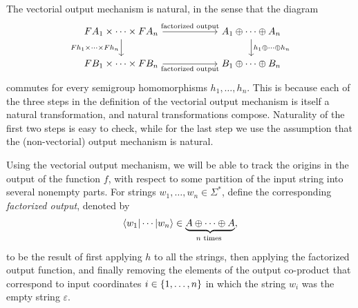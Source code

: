 The  vectorial output mechanism is natural, in the  sense that  the diagram 
\[
\begin{tikzcd}
    [column sep=2cm]
\functor A_1 \times \cdots \times \functor A_n
\ar[r,"\text{factorized output}"]
\ar[d,"\functor h_1 \times \cdots \times \functor h_n"']
&
A_1 \oplus \cdots \oplus A_n
\ar[d,"h_1 \oplus \cdots \oplus h_n"]
\\
\functor B_1 \times \cdots \times \functor B_n
\ar[r,"\text{factorized output}"']
&
B_1 \oplus \cdots \oplus B_n
\end{tikzcd}
\]
commutes
for every semigroup homomorphisms $h_1,\ldots,h_n$. This is because each of the three steps in the definition of the vectorial output mechanism is itself a natural transformation, and natural transformations compose.  Naturality of the first two steps is easy to check, while for the last step we use the assumption that the (non-vectorial) output mechanism is natural.



    
Using the vectorial output mechanism, we will be able to track the origins in the output of the function $f$, with respect to some partition of the input string into several nonempty parts.
For  strings $w_1,\ldots,w_n \in \Sigma^*$, define the corresponding \emph{factorized output}, denoted by 
\begin{align*}
\tuple{w_1| \cdots | w_n} \in \myunderbrace{A \oplus \cdots \oplus A}{$n$ times},
\end{align*}
to be the result of first applying $h$ to all the strings, then applying the factorized output function, and finally removing the elements of the output co-product that correspond to input coordinates $i \in \{1,\ldots,n\}$ in which the string $w_i$ was the empty string $\varepsilon$. 

